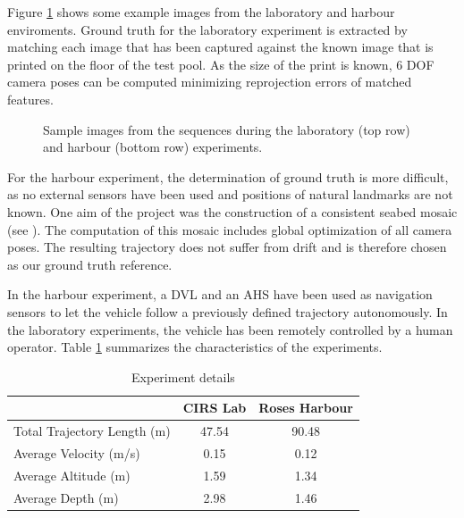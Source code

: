 \documentclass[conference]{IEEEtran}
\begin{document}

Figure \ref{sample-images} shows some example images from the laboratory and harbour enviroments. Ground truth for the laboratory experiment is extracted by matching each image that has been captured against the known image that is printed on the floor of the test pool. As the size of the print is known, 6 DOF camera poses can be computed minimizing reprojection errors of matched features.

\begin{figure}
  \noindent{}
  \caption{Sample images from the sequences during the laboratory (top row) and harbour (bottom row) experiments.}
  \label{sample-images}
\end{figure}

For the harbour experiment, the determination of ground truth is more difficult, as no external sensors have been used and positions of natural landmarks are not known. One aim of the project was the construction of a consistent seabed mosaic (see \cite{Ferrer2007}). The computation of this mosaic includes global optimization of all camera poses. The resulting trajectory does not suffer from drift and is therefore chosen as our ground truth reference.

In the harbour experiment, a DVL and an AHS have been used as navigation sensors to let the vehicle follow a previously defined trajectory autonomously. In the laboratory experiments, the vehicle has been remotely controlled by a human operator. Table \ref{experiment-details} summarizes the characteristics of the experiments.

\begin{table}[!t]
  \renewcommand{\arraystretch}{1.3}
  \caption{Experiment details}
  \label{experiment-details}
  \centering
  \begin{tabular}{lcc}
    & \textbf{CIRS Lab} & \textbf{Roses Harbour}  \\ \hline
    Total Trajectory Length (m)     & 47.54 & 90.48  \\
    Average Velocity (m/s)          & 0.15 & 0.12  \\
    Average Altitude (m)            & 1.59 & 1.34  \\
    Average Depth (m)               & 2.98 & 1.46  \\
  \end{tabular}
\end{table}
\end{document}
